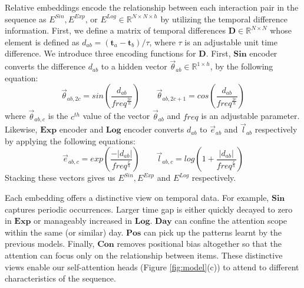 Relative embeddings encode the relationship between each interaction pair in the sequence as $E^{Sin}, E^{Exp}\text{, or } E^{Log} \in \mathbb{R}^{N \times N \times h}$ by utilizing the temporal difference information. First, we define a matrix of temporal differences $\mathbf{D} \in \mathbb{R}^{N \times N}$ whose element is defined as $d_{ab} = (\mathbf{t}_a-\mathbf{t}_b)/\tau$, where $\tau$ is an adjustable unit time difference. We introduce three encoding functions for \textbf{D}.
First, $\textbf{Sin}$ encoder converts the difference $d_{ab}$ to a hidden vector $\vec{\theta}_{ab} \in \mathbb{R}^{1 \times h}$, by the following equation:
\begin{equation}
    \vec{\theta}_{ab, 2c} = sin(\frac{d_{ab}}{freq^{\frac{2c}{h}}})\qquad\vec{\theta}_{ab, 2c+1} = cos(\frac{d_{ab}}{freq^{\frac{2c}{h}}})
\end{equation}
where $\vec{\theta}_{ab, c}$ is the $c^{th}$ value of the vector $\vec{\theta}_{ab}$ and $freq$ is an adjustable parameter.
Likewise, $\textbf{Exp}$ encoder and $\textbf{Log}$ encoder converts $d_{ab}$ to $\vec{e}_{ab}$ and $\vec{l}_{ab}$ respectively by applying the following equations:
\begin{equation}
  \vec{e}_{ab, c} = exp(\frac{-|d_{ab}|}{freq^{\frac{c}{h}}}) \qquad
  \vec{l}_{ab, c} = log(1 + \frac{|d_{ab}|}{freq^{\frac{c}{h}}})
\end{equation}
Stacking these vectors gives us $E^{Sin}, E^{Exp}$ and $E^{Log}$ respectively.

Each embedding offers a distinctive view on temporal data. For example, $\textbf{Sin}$ captures periodic occurrences. Larger time gap is either quickly decayed to zero in $\textbf{Exp}$ or manageably increased in $\textbf{Log}$. $\textbf{Day}$ can confine the attention scope within the same (or similar) day. $\textbf{Pos}$ can pick up the patterns learnt by the previous models. Finally, $\textbf{Con}$ removes positional bias altogether so that the attention can focus only on the relationship between items. These distinctive views enable our self-attention heads (Figure \ref{fig:model}(c)) to attend to different characteristics of the sequence.